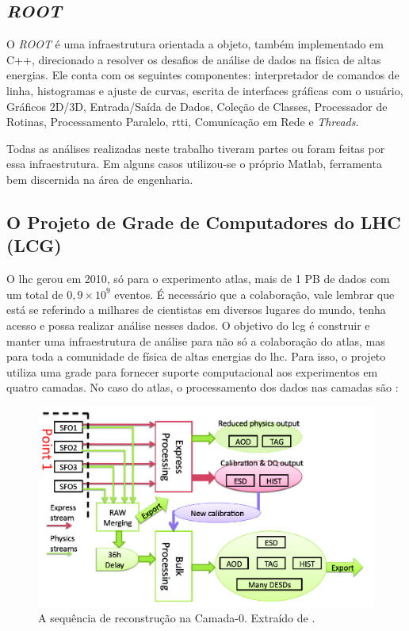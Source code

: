 \subsection{\emph{ROOT}}
\label{ssec:root}

O \emph{ROOT} é uma infraestrutura orientada a objeto, também implementado em C++, 
direcionado a resolver os desafios de análise de dados na física de altas 
energias. Ele conta com os seguintes componentes: interpretador de comandos 
de linha, histogramas e ajuste de curvas, escrita de interfaces gráficas com 
o usuário, Gráficos 2D/3D, Entrada/Saída de Dados, Coleção de Classes, 
Processador de Rotinas, Processamento Paralelo, \gls{rtti}, Comunicação em
Rede e \emph{Threads}.

Todas as análises realizadas neste trabalho tiveram partes ou foram feitas por essa
infraestrutura. Em alguns casos utilizou-se o próprio Matlab, ferramenta bem
discernida na área de engenharia.

\subsection{O Projeto de Grade de Computadores do LHC (LCG)}
\label{ssec:lcg}

O \gls{lhc} gerou em 2010, só para o experimento \gls{atlas}, mais de 1 PB de dados
com um total de $0,9 \times 10^9$ eventos. É necessário que a colaboração, 
vale lembrar que está se referindo a milhares de cientistas em diversos lugares
do mundo, tenha acesso e possa realizar análise nesses dados. 
O objetivo do \gls{lcg} é construir e manter uma 
infraestrutura de análise para não só a colaboração do \gls{atlas}, mas para toda 
a comunidade de física de altas energias do \gls{lhc}.
Para isso, o projeto utiliza uma grade para fornecer suporte computacional 
aos experimentos em quatro camadas. No caso do \gls{atlas}, o processamento dos
dados nas camadas são \cite{grid,atlas_computing_tdr,tier0_reconstruction_atlas}:

\begin{figure}[h!t]
\centering
\includegraphics[width=\textwidth]{imagens/tier0_stream.png}
\caption[A sequência de reconstrução na Camada-0]{A sequência de reconstrução na Camada-0. Extraído de
\cite{tier0_reconstruction_atlas}.}
\label{fig:tier0_stream}
\end{figure}

